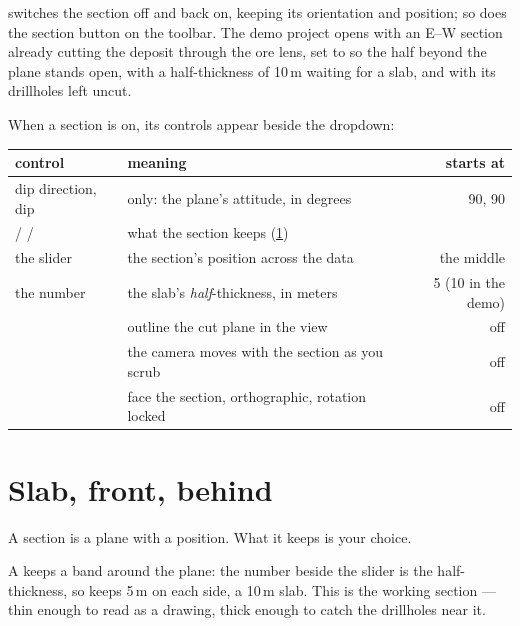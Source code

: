  switches the section off and back on, keeping its orientation and position; so does the section button on the toolbar. The demo project opens with an E–W section already cutting the deposit through the ore lens, set to  so the half beyond the plane stands open, with a half-thickness of 10\,m waiting for a slab, and with its drillholes left uncut.

When a section is on, its controls appear beside the dropdown:

\begin{center}
\begin{tabularx}{\linewidth}{@{}lMD@{}}\toprule
control & meaning & starts at \\ \midrule
dip direction, dip &  only: the plane's attitude, in degrees & 90, 90 \\
 /  /  & what the section keeps (\cref{sec:sections-slab}) &  \\
the slider & the section's position across the data & the middle \\
the number & the slab's \emph{half}-thickness, in meters & 5 (10 in the demo) \\
 & outline the cut plane in the view & off \\
 & the camera moves with the section as you scrub & off \\
 & face the section, orthographic, rotation locked & off \\ \bottomrule
\end{tabularx}
\end{center}


\section{Slab, front, behind}\label{sec:sections-slab}
A section is a plane with a position. What it keeps is your choice.

A  keeps a band around the plane: the number beside the slider is the half-thickness, so  keeps 5\,m on each side, a 10\,m slab. This is the working section — thin enough to read as a drawing, thick enough to catch the drillholes near it.

